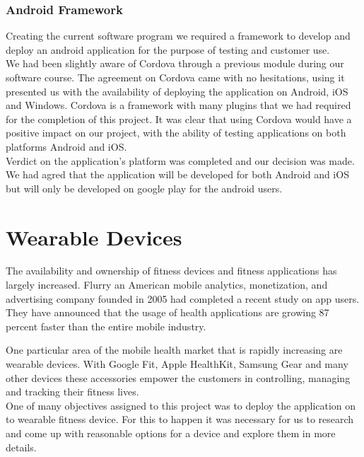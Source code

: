 \documentclass[a4paper,12pt,twoside]{report}
\begin{document}
\subsubsection{Android Framework}

Creating the current software program we required a framework to develop and deploy an android application for the purpose of testing and customer use.\\

We had been slightly aware of Cordova through a previous module during our software course.
The agreement on Cordova came with no hesitations, using it presented us with the availability of deploying the application on Android, iOS and Windows. 
Cordova is a framework with many plugins that we had required for the completion of this project. 
It was clear that using Cordova would have a positive impact on our project, with the ability of testing applications on both platforms Android and iOS.
\cite{cordova}\\

Verdict on the application's platform was completed and our decision was made. We had agred that the application will be developed for both Android and iOS but will only be developed on google play for the android users. 

\section{Wearable Devices}
\vspace{5mm} %
The availability and ownership of fitness devices and fitness applications has largely increased. Flurry an American mobile analytics, monetization, and advertising company founded in 2005 had completed a recent study on app users.
They have announced that the usage of health applications are growing 87 percent faster than the entire mobile industry.

One particular area of the mobile health market that is rapidly increasing are wearable devices. With Google Fit, Apple HealthKit, Samsung Gear and many other devices these accessories empower the customers in controlling, managing and tracking their fitness lives.\cite{rhodes2014accessing}\\

One of many objectives assigned to this project was to deploy the application on to wearable fitness device. 
For this to happen it was necessary for us to research and come up with reasonable options for a device and explore them in more details.
\end{document}
